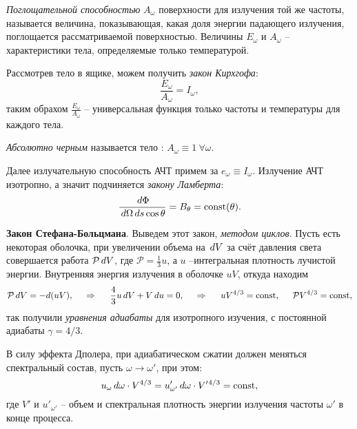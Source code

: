 \textit{Поглощательной способностью} $A_\omega$ поверхности для излучения той же частоты, называется величина, показывающая, какая доля энергии падающего излучения, поглощается рассматриваемой поверхностью. Величины $E_\omega$ и $A_\omega$ -- характеристики тела, определяемые только температурой. 


Рассмотрев тело в ящике, можем получить \textit{закон Кирхгофа}:
\begin{equation}
    \frac{E_\omega}{A_\omega} =  I_\omega,
\end{equation}
таким обрахом $\frac{E_\omega}{A_\omega}$ -- универсальная функция только частоты и температуры для каждого тела. 



\begin{to_def}
    \textit{Абсолютно черным} называется тело : $A_\omega \equiv 1 \ \forall \omega$.
\end{to_def}

Далее излучательную способность АЧТ примем за $e_\omega \equiv I_\omega$. Излучение АЧТ изотропно, а значит подчиняется \textit{закону Ламберта}:
\begin{equation*}
    \frac{\, d \Phi}{\, d \Omega \, d s \cos \theta} = B_\theta = \textnormal{const}(\theta).
\end{equation*}


\textbf{Закон Стефана-Больцмана}. Выведем этот закон, \textit{методом циклов}. Пусть есть некоторая оболочка, при увеличении объема на $\, d V$ за счёт давления света совершается работа $\mathcal P \, d V$, где $\mathcal P = \frac{1}{3} u$,  а $u$ --интегральная плотность лучистой энергии. Внутренняя энергия излучения в оболочке  $uV$, откуда находим
\begin{equation*}
    \mathcal P \, d V = - d(uV),
    \hspace{0.5cm} \Rightarrow \hspace{0.5cm}
    \frac{4}{3} u \, d V + V \, d u = 0,
    \hspace{0.5cm} \Rightarrow \hspace{0.5cm}
    u V^{4/3} = \textnormal{const}, \hspace{5 mm} \mathcal P V^{4/3} = \textnormal{const},
\end{equation*}
так получили \textit{уравнения адиабаты} для изотропного изучения, с постоянной адиабаты $\gamma = 4/3$. 



В силу эффекта Дполера, при адиабатическом сжатии должен меняться спектральный состав, пусть $\omega \to \omega'$, при этом:
\begin{equation*}
    u_\omega \, d \omega \cdot V^{4/3} = u'_{\omega'} \, d \omega \cdot V'{}^{4/3} = \textnormal{const},
\end{equation*}
где $V'$ и $u'_{\omega'}$ -- объем и спектральная плотность энергии излучения частоты $\omega'$ в конце процесса. 


